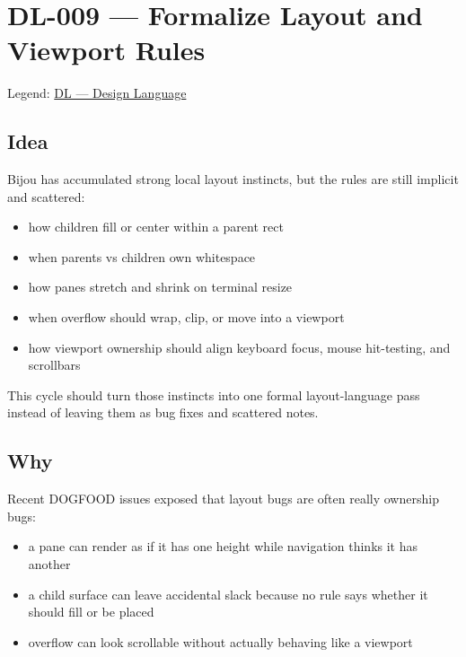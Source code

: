 \chapter{DL-009 --- Formalize Layout and Viewport Rules}\label{record-296}

\smallskip

Legend: \href{https://github.com/flyingrobots/bijou/blob/cbd70612140e7a450d764b3c7be1c6af878b99bc/docs/method/graveyard/legends/DL-design-language.md}{DL --- Design Language}

\section{Idea}\label{record-296-idea}

Bijou has accumulated strong local layout instincts, but the rules are still implicit and scattered:

\begin{itemize}
\tightlist
\item
  how children fill or center within a parent rect
\item
  when parents vs children own whitespace
\item
  how panes stretch and shrink on terminal resize
\item
  when overflow should wrap, clip, or move into a viewport
\item
  how viewport ownership should align keyboard focus, mouse hit-testing, and scrollbars
\end{itemize}

This cycle should turn those instincts into one formal layout-language pass instead of leaving them as bug fixes and scattered notes.

\section{Why}\label{record-296-why}

Recent DOGFOOD issues exposed that layout bugs are often really ownership bugs:

\begin{itemize}
\tightlist
\item
  a pane can render as if it has one height while navigation thinks it has another
\item
  a child surface can leave accidental slack because no rule says whether it should fill or be placed
\item
  overflow can look scrollable without actually behaving like a viewport
\end{itemize}

